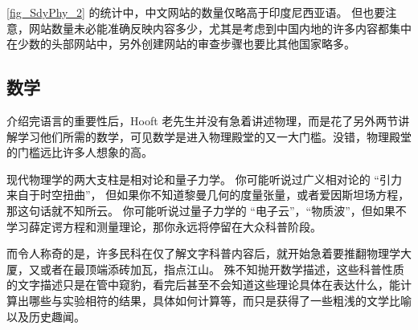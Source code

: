 \autoref{fig_SdyPhy_2} 的统计中，中文网站的数量仅略高于印度尼西亚语。 但也要注意，网站数量未必能准确反映内容多少，尤其是考虑到中国内地的许多内容都集中在少数的头部网站中，另外创建网站的审查步骤也要比其他国家略多。

\subsection{数学}
介绍完语言的重要性后，Hooft 老先生并没有急着讲述物理，而是花了另外两节讲解学习他们所需的数学，可见数学是进入物理殿堂的又一大门槛。没错，物理殿堂的门槛远比许多人想象的高。

现代物理学的两大支柱是相对论和量子力学。 你可能听说过广义相对论的 “引力来自于时空扭曲”， 但如果你不知道黎曼几何的度量张量，或者爱因斯坦场方程，那这句话就不知所云。 你可能听说过量子力学的 “电子云”，“物质波”，但如果不学习薛定谔方程和测量理论，那你永远将停留在大众科普阶段。

而令人称奇的是，许多民科在仅了解文字科普内容后，就开始急着要推翻物理学大厦，又或者在最顶端添砖加瓦，指点江山。 殊不知抛开数学描述，这些科普性质的文字描述只是在管中窥豹，看完后甚至不会知道这些理论具体在表达什么，能计算出哪些与实验相符的结果，具体如何计算等，而只是获得了一些粗浅的文学比喻以及历史趣闻。
